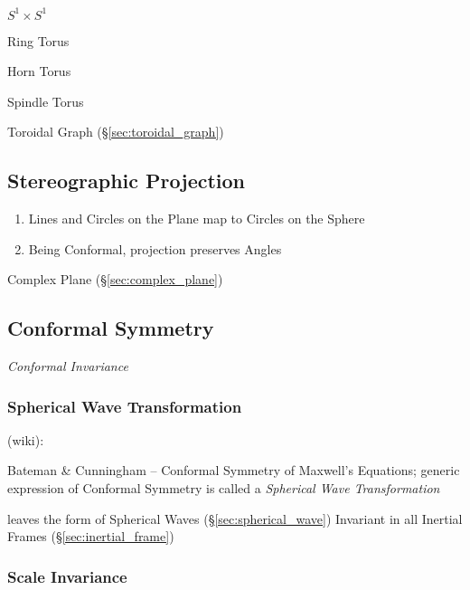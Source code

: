 $S^1 \times S^1$

Ring Torus

Horn Torus

Spindle Torus

\fist Toroidal Graph (\S\ref{sec:toroidal_graph})



\subsection{Stereographic Projection}\label{sec:stereographic_projection}

\begin{enumerate}
  \item Lines and Circles on the Plane map to Circles on the Sphere
  \item Being Conformal, projection preserves Angles
\end{enumerate}

Complex Plane (\S\ref{sec:complex_plane})



\subsection{Conformal Symmetry}\label{sec:conformal_symmetry}

\emph{Conformal Invariance}



\subsubsection{Spherical Wave Transformation}
\label{sec:spherical_wave_transformation}

(wiki):

Bateman \& Cunningham -- Conformal Symmetry of Maxwell's Equations; generic
expression of Conformal Symmetry is called a \emph{Spherical Wave
  Transformation}

leaves the form of Spherical Waves (\S\ref{sec:spherical_wave}) Invariant in
all Inertial Frames (\S\ref{sec:inertial_frame})



\subsubsection{Scale Invariance}\label{sec:scale_invariance}

